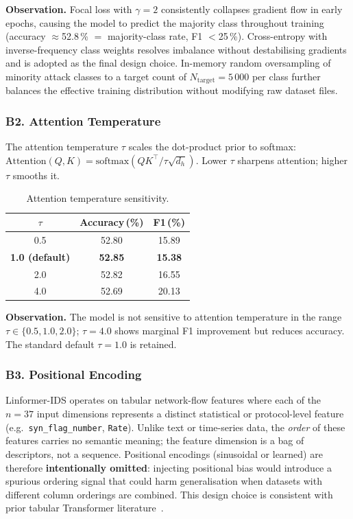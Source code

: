 \textbf{Observation.}
Focal loss with $\gamma=2$ consistently collapses gradient flow in early
epochs, causing the model to predict the majority class throughout training
(accuracy $\approx$52.8\,\% $=$ majority-class rate, F1 $<$25\,\%).
Cross-entropy with inverse-frequency class weights resolves imbalance without
destabilising gradients and is adopted as the final design choice.
In-memory random oversampling of minority attack classes to a target count of
$N_{\text{target}}=5\,000$ per class further balances the effective training
distribution without modifying raw dataset files.

\subsubsection{B2. Attention Temperature}

The attention temperature $\tau$ scales the dot-product prior to softmax:
$\text{Attention}(Q,K) = \text{softmax}(QK^\top / \tau\sqrt{d_h})$.
Lower $\tau$ sharpens attention; higher $\tau$ smooths it.

\begin{table}[h]
\centering
\caption{Attention temperature sensitivity.}
\label{tab:attention_temp}
\begin{tabular}{ccc}
\toprule
$\tau$ & Accuracy\,(\%) & F1\,(\%) \\
\midrule
0.5 & 52.80 & 15.89 \\
\textbf{1.0 (default)} & \textbf{52.85} & \textbf{15.38} \\
2.0 & 52.82 & 16.55 \\
4.0 & 52.69 & 20.13 \\
\bottomrule
\end{tabular}
\end{table}

\textbf{Observation.}
The model is not sensitive to attention temperature in the range
$\tau \in \{0.5, 1.0, 2.0\}$; $\tau=4.0$ shows marginal F1 improvement but
reduces accuracy.
The standard default $\tau=1.0$ is retained.

\subsubsection{B3. Positional Encoding}

Linformer-IDS operates on tabular network-flow features where each of the
$n=37$ input dimensions represents a distinct statistical or protocol-level
feature (e.g.\ \texttt{syn\_flag\_number}, \texttt{Rate}).
Unlike text or time-series data, the \emph{order} of these features carries no
semantic meaning; the feature dimension is a bag of descriptors, not a
sequence.
Positional encodings (sinusoidal or learned) are therefore
\textbf{intentionally omitted}: injecting positional bias would introduce a
spurious ordering signal that could harm generalisation when datasets with
different column orderings are combined.
This design choice is consistent with prior tabular Transformer
literature~\citep{huang2020tabtransformer}.

